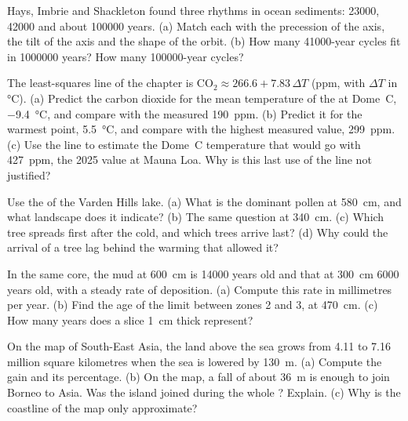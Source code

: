 \begin{exercise}[$\star$]\label{exo:g12:past-climates:5}
Hays, Imbrie and Shackleton found three rhythms in ocean sediments:
\num{23000}, \num{42000} and about \num{100000} years. (a) Match each with the
precession of the axis, the tilt of the axis and the shape of the orbit.
(b) How many \num{41000}-year cycles fit in \num{1000000} years? How many
\num{100000}-year cycles?
\end{exercise}

\begin{exercise}[$\star\star$]\label{exo:g12:past-climates:6}
The least-squares line of the chapter is $\mathrm{CO_2} \approx 266.6 +
7.83\,\Delta T$ (ppm, with $\Delta T$ in \unit{\degreeCelsius}).
(a) Predict the carbon dioxide for the mean temperature of the  at Dome~C, \qty{-9.4}{\degreeCelsius}, and compare with the measured
\qty{190}{ppm}. (b) Predict it for the warmest point, \qty{+5.5}{\degreeCelsius},
and compare with the highest measured value, \qty{299}{ppm}. (c) Use the line
to estimate the Dome~C temperature that would go with \qty{427}{ppm}, the
2025 value at Mauna Loa. Why is this last use of the line not justified?
\end{exercise}

\begin{exercise}[$\star\star$]\label{exo:g12:past-climates:7}
Use the  of the Varden Hills lake. (a) What is the dominant
pollen at \qty{580}{cm}, and what landscape does it indicate? (b) The same
question at \qty{340}{cm}. (c) Which tree spreads first after the cold, and
which trees arrive last? (d) Why could the arrival of a tree lag behind the
warming that allowed it?
\end{exercise}

\begin{exercise}[$\star\star$]\label{exo:g12:past-climates:8}
In the same core, the mud at \qty{600}{cm} is \num{14000} years old and that
at \qty{300}{cm} \num{6000} years old, with a steady rate of deposition.
(a) Compute this rate in millimetres per year. (b) Find the age of the limit
between zones 2 and 3, at \qty{470}{cm}. (c) How many years does a slice
\qty{1}{cm} thick represent?
\end{exercise}

\begin{exercise}[$\star\star$]\label{exo:g12:past-climates:9}
On the map of South-East Asia, the land above the sea grows from 4.11 to
7.16 million square kilometres when the sea is lowered by \qty{130}{m}.
(a) Compute the gain and its percentage. (b) On the map, a fall of about
\qty{36}{m} is enough to join Borneo to Asia. Was the island joined during the whole ? Explain. (c) Why is the coastline of the map only
approximate?
\end{exercise}

